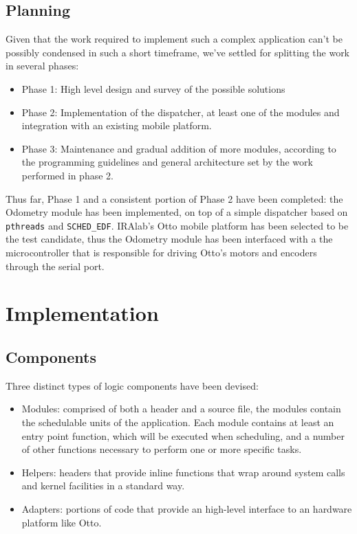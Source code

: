 \documentclass[a4paper,12pt]{report}
\begin{document}
\subsection{Planning}

Given that the work required to implement such a complex application can't be possibly condensed in such a short timeframe, we've settled for splitting the work in several phases:
\begin{itemize}
  \item Phase 1: High level design and survey of the possible solutions
  \item Phase 2: Implementation of the dispatcher, at least one of the modules and integration with an existing mobile platform.
  \item Phase 3: Maintenance and gradual addition of more modules, according to the programming guidelines and general architecture set by the work performed in phase 2.
\end{itemize}

Thus far, Phase 1 and a consistent portion of Phase 2 have been completed: the Odometry module has been implemented, on top of a simple dispatcher based on \texttt{pthreads} and \texttt{SCHED\_EDF}. IRAlab's Otto\cite{fdila-bs-otto} mobile platform has been selected to be the test candidate, thus the Odometry module has been interfaced with a the microcontroller that is responsible for driving Otto's motors and encoders through the serial port.

\section{Implementation}

\subsection{Components}

Three distinct types of logic components have been devised:
\begin{itemize}
    \item Modules: comprised of both a header and a source file, the modules contain the schedulable units of the application. Each module contains at least an entry point function, which will be executed when scheduling, and a number of other functions necessary to perform one or more specific tasks.   
    \item Helpers: headers that provide inline functions that wrap around system calls and kernel facilities in a standard way.
    \item Adapters: portions of code that provide an high-level interface to an hardware platform like Otto.
\end{itemize}
\end{document}
